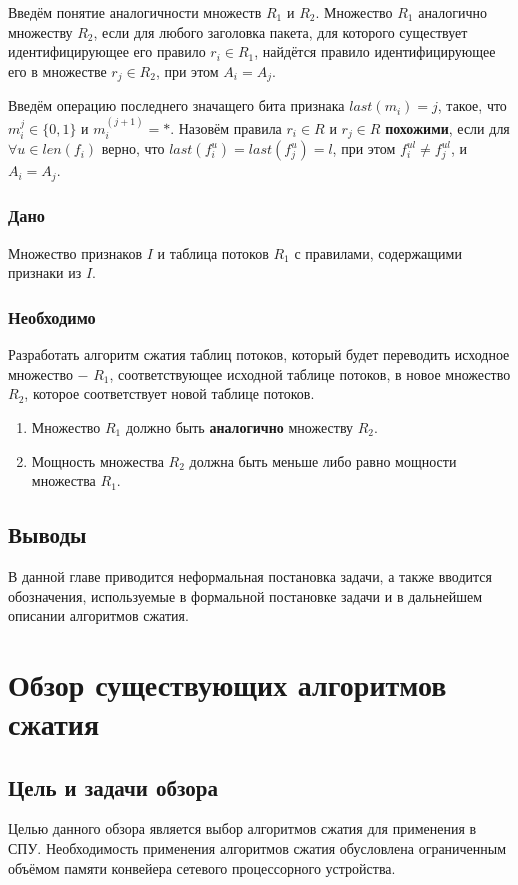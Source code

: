 \documentclass[oneside,final,12pt]{extarticle}
\begin{document}
        Введём понятие аналогичности множеств \(R_1\) и \(R_2\).
        Множество \(R_1\) аналогично множеству \(R_2\), если для любого заголовка пакета, для которого существует идентифицирующее его правило \(r_i \in R_1\), 
        найдётся правило идентифицирующее его в множестве \(r_j \in R_2\), при этом \(A_i = A_j\).

        Введём операцию последнего значащего бита признака \(last(m_i) = j\), такое, что \(m_i^j \in \{0, 1\}\) и \(m_i^{(j+1)} = *\). 
        Назовём правила \(r_i \in R\) и \(r_j \in R\) \textbf{похожими}, 
        если для \(\forall u \in len(f_i)\) верно, что \(last(f_i^u) = last(f_j^u) = l\), при этом \(f_i^{ul} \neq f_j^{ul}\), и \(A_i = A_j\).

        \subsubsection*{Дано}
            Множество признаков \(I\) и таблица потоков \(R_1\) с правилами, 
            содержащими признаки из \(I\).
        \subsubsection*{Необходимо}
        Разработать алгоритм сжатия таблиц потоков, который будет переводить исходное множество $-$ \(R_1\), соответствующее исходной таблице потоков, в
        новое множество \(R_2\), которое соответствует новой таблице потоков.
        \begin{enumerate}
            \item Множество \(R_1\) должно быть \textbf{аналогично} множеству \(R_2\).
            \item Мощность множества \(R_2\) должна быть меньше либо равно мощности множества \(R_1\).
        \end{enumerate}
        \subsection{Выводы}
            В данной главе приводится неформальная постановка задачи, 
            а также вводится обозначения, используемые в формальной постановке задачи 
            и в дальнейшем описании алгоритмов сжатия.

    \section{Обзор существующих алгоритмов сжатия}
       \label{sect:related} 
        \subsection{Цель и задачи обзора}
        Целью данного обзора является выбор алгоритмов сжатия для применения в СПУ. 
        Необходимость применения алгоритмов сжатия обусловлена ограниченным объёмом памяти конвейера сетевого процессорного устройства.
        
\end{document}
